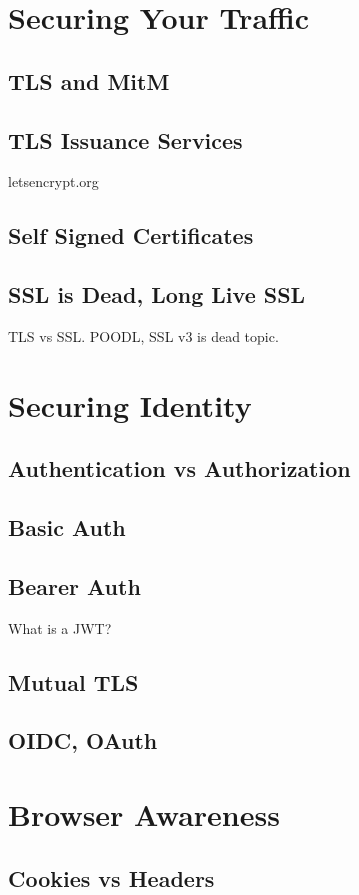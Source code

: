 \documentclass[12pt,oneside]{book} %
\begin{document}
\chapter{Securing Your Traffic}
\section{TLS and MitM}
\section{TLS Issuance Services}
letsencrypt.org
\section{Self Signed Certificates}
\section{SSL is Dead, Long Live SSL}
TLS vs SSL.  POODL, SSL v3 is dead topic.

\chapter{Securing Identity}
\section{Authentication vs Authorization}
\section{Basic Auth}
\section{Bearer Auth}
What is a JWT?
\section{Mutual TLS}
\section{OIDC, OAuth}

\chapter{Browser Awareness}
\section{Cookies vs Headers}
\end{document}
